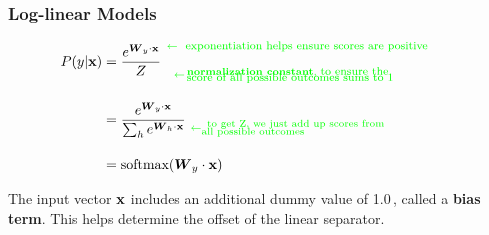 \documentclass[xcolor=pdftex,x11names,table,hyperref]{beamer}
\begin{document}
\begin{frame}[fragile]\frametitle{Log-linear Models}
	\begin{Large}
	\begin{align}
		P(y | \mathbf{x}) & = \frac{{\mathnormal e}^{\boldsymbol W_y \cdot \mathbf{x}} }{Z} \hspace*{0.4em} \substack{\color{green}{ \leftarrow \, \text{\parbox[c]{0.58\textwidth}{ {\footnotesize \, exponentiation helps ensure scores are positive}}}} \\[1.0em]  \color{green}{ \leftarrow \, \text{\parbox[c]{0.55\textwidth}{ \textbf{normalization constant}, {\footnotesize to ensure the \\[-0.9em] score of all possible outcomes sums to 1}}}}}  \nonumber\\[1.0em]
							& =	\frac{{\mathnormal e}^{\boldsymbol W_y \cdot \mathbf{x}}}{\sum_h {\mathnormal e}^{\boldsymbol W_h \cdot \mathbf{x}}}  \,\, \substack{ \, \\[1.0em]  \color{green}{ \leftarrow \text{\parbox[c]{0.50\textwidth}{ \, to get Z, we just add up scores from \\[-0.8em] all possible outcomes}}}} \nonumber\\[1.0em]
							& = \text{softmax}(\boldsymbol W_y \cdot \mathbf{x}) \nonumber%
	\end{align}
	\end{Large}
	\pause

	The input vector $\bf x$ includes an additional dummy value of 1.0\,, called a \textbf{bias term}.
	This helps determine the offset of the linear separator.  %
\end{frame}
\end{document}
